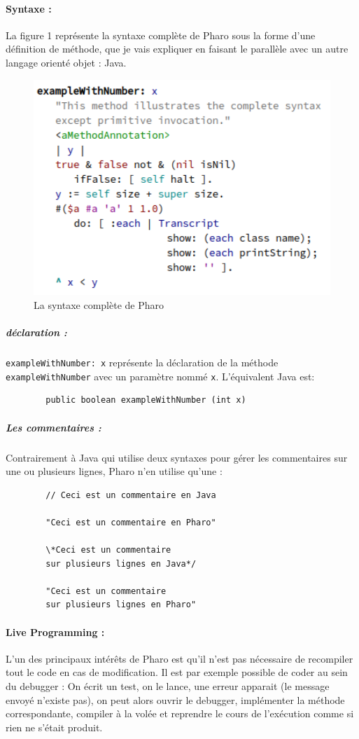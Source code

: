	\paragraph{Syntaxe :}
	La figure 1 représente la syntaxe complète de Pharo sous la forme d'une définition de méthode, que je vais expliquer en faisant le parallèle avec un autre langage orienté objet : Java.
	
	\begin{figure}
		\includegraphics[width=12cm]{./img/pharo_syntax.png}
		\caption[pharosyntax]{La syntaxe complète de Pharo}
	\end{figure}
	
	\subparagraph{déclaration :}
	\verb$exampleWithNumber: x$	représente la déclaration de la méthode \verb$exampleWithNumber$ avec un paramètre nommé \verb$x$. L'équivalent Java est:
	\begin{verbatim}
		public boolean exampleWithNumber (int x)
	\end{verbatim}
	
	\subparagraph{Les commentaires :}
	Contrairement à Java qui utilise deux syntaxes pour gérer les commentaires sur une ou plusieurs lignes, Pharo n'en utilise qu'une :
	\begin{verbatim}
		// Ceci est un commentaire en Java
		
		"Ceci est un commentaire en Pharo"
		
		\*Ceci est un commentaire
		sur plusieurs lignes en Java*/
		
		"Ceci est un commentaire
		sur plusieurs lignes en Pharo"
	\end{verbatim}
	
	\paragraph{Live Programming :}
	L'un des principaux intérêts de Pharo est qu'il n'est pas nécessaire de recompiler tout le code en cas de modification. Il est par exemple possible de coder au sein du debugger : On écrit un test, on le lance, une erreur apparait (le message envoyé n'existe pas), on peut alors ouvrir le debugger, implémenter la méthode correspondante, compiler à la volée et reprendre le cours de l'exécution comme si rien ne s'était produit.
	
